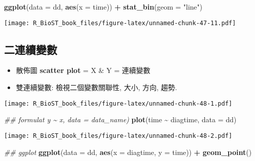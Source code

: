 \documentclass[
]{book}
\newenvironment{Shaded}{\begin{snugshade}}{\end{snugshade}}
\newcommand{\CommentTok}[1]{\textcolor[rgb]{0.56,0.35,0.01}{\textit{#1}}}
\newcommand{\DataTypeTok}[1]{\textcolor[rgb]{0.13,0.29,0.53}{#1}}
\newcommand{\KeywordTok}[1]{\textcolor[rgb]{0.13,0.29,0.53}{\textbf{#1}}}
\newcommand{\NormalTok}[1]{#1}
\newcommand{\OperatorTok}[1]{\textcolor[rgb]{0.81,0.36,0.00}{\textbf{#1}}}
\newcommand{\StringTok}[1]{\textcolor[rgb]{0.31,0.60,0.02}{#1}}
\providecommand{\tightlist}{%
  \setlength{\itemsep}{0pt}\setlength{\parskip}{0pt}}
\begin{document}
\begin{Shaded}
\begin{Highlighting}[]
\KeywordTok{ggplot}\NormalTok{(}\DataTypeTok{data =}\NormalTok{ dd, }\KeywordTok{aes}\NormalTok{(}\DataTypeTok{x =}\NormalTok{ time)) }\OperatorTok{+}\StringTok{ }
\StringTok{  }\KeywordTok{stat\_bin}\NormalTok{(}\DataTypeTok{geom =} \StringTok{"line"}\NormalTok{)}
\end{Highlighting}
\end{Shaded}

\texttt{[image: R\_BioST\_book\_files/figure-latex/unnamed-chunk-47-11.pdf]}

\hypertarget{ux4e8cux9023ux7e8cux8b8aux6578}{%
\subsection{二連續變數}\label{ux4e8cux9023ux7e8cux8b8aux6578}}

\begin{itemize}
\tightlist
\item
  散佈圖 \textbf{scatter plot} = X \& Y = 連續變數
\item
  雙連續變數: 檢視二個變數關聯性, 大小, 方向, 趨勢.
\end{itemize}

\begin{Shaded}
\end{Shaded}

\texttt{[image: R\_BioST\_book\_files/figure-latex/unnamed-chunk-48-1.pdf]}

\begin{Shaded}
\begin{Highlighting}[]
\CommentTok{\#\# formulat y \textasciitilde{} x, data = data\_name)}
\KeywordTok{plot}\NormalTok{(time }\OperatorTok{\textasciitilde{}}\StringTok{ }\NormalTok{diagtime, }\DataTypeTok{data =}\NormalTok{ dd)}
\end{Highlighting}
\end{Shaded}

\texttt{[image: R\_BioST\_book\_files/figure-latex/unnamed-chunk-48-2.pdf]}

\begin{Shaded}
\begin{Highlighting}[]
\CommentTok{\#\# ggplot}
\KeywordTok{ggplot}\NormalTok{(}\DataTypeTok{data =}\NormalTok{ dd, }\KeywordTok{aes}\NormalTok{(}\DataTypeTok{x =}\NormalTok{ diagtime, }\DataTypeTok{y =}\NormalTok{ time)) }\OperatorTok{+}\StringTok{ }
\StringTok{  }\KeywordTok{geom\_point}\NormalTok{()}
\end{Highlighting}
\end{Shaded}
\end{document}

